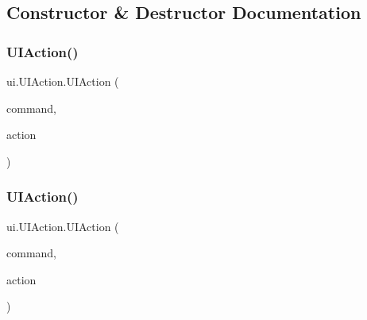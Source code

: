 \subsection{Constructor \& Destructor Documentation}
\mbox{\label{classui_1_1_u_i_action_a7dd1469b824c4a4d3d4a04e5c0e66709}} 
\subsubsection{\texorpdfstring{U\+I\+Action()}{UIAction()}\hspace{0.1cm}{\footnotesize\ttfamily [1/2]}}
{\footnotesize\ttfamily ui.\+U\+I\+Action.\+U\+I\+Action (\begin{DoxyParamCaption}\item[{\mbox{\hyperlink{enumui_1_1commands_1_1_user_to_game_call}{User\+To\+Game\+Call}}}]{command,  }\item[{\mbox{\hyperlink{enumrule_engine_1_1_e_game_action_type}{E\+Game\+Action\+Type}}}]{action }\end{DoxyParamCaption})\hspace{0.3cm}{\ttfamily [inline]}}

\mbox{\label{classui_1_1_u_i_action_a46c2d54f12814fc80f84c2becae3f748}} 
\subsubsection{\texorpdfstring{U\+I\+Action()}{UIAction()}\hspace{0.1cm}{\footnotesize\ttfamily [2/2]}}
{\footnotesize\ttfamily ui.\+U\+I\+Action.\+U\+I\+Action (\begin{DoxyParamCaption}\item[{\mbox{\hyperlink{enumui_1_1commands_1_1_user_to_game_call}{User\+To\+Game\+Call}}}]{command,  }\item[{\mbox{\hyperlink{classrule_engine_1_1_game_action}{Game\+Action}}}]{action }\end{DoxyParamCaption})\hspace{0.3cm}{\ttfamily [inline]}}



